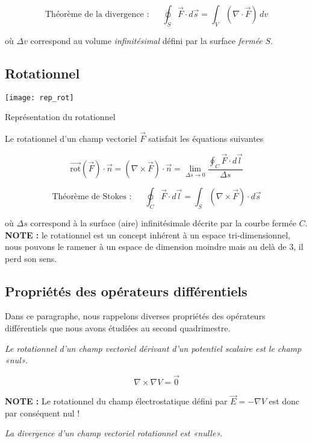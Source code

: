 \[\mbox{Théorème de la divergence : } \hspace{15pt} \oint_{S} \vec{F} \cdot d\vec{s} = \int_{V} (\nabla \cdot \vec{F}) \, dv\]

où $\Delta v$ correspond au volume \textit{infinitésimal} défini par la surface \textit{fermée} $S$.



\subsection{Rotationnel} 
\begin{marginfigure}
	\texttt{[image: rep\_rot]}
	\caption{Représentation du rotationnel}
\end{marginfigure}

Le rotationnel d'un champ vectoriel $\vec{F}$ satisfait les équations suivantes  

\[  \vec{\text{rot}}(\vec{F}) \cdot \vec{n}   = (\nabla \times \vec{F}) \cdot \vec{n} = \lim_{\Delta s \to 0} \frac{\oint_{C} \vec{F} \cdot d\vec{l} }{\Delta s}\]

\[\mbox{Théorème de Stokes : } \hspace{15pt} \oint_{C} \vec{F} \cdot d\vec{l} = \int_{S} (\nabla \times \vec{F}) \cdot d\vec{s}\]

où $\Delta s$ correspond à la surface (aire) infinitésimale décrite par la courbe fermée $C$. \\
\textbf{NOTE : } le rotationnel est un concept inhérent à un espace tri-dimensionnel, nous pouvons le ramener à un espace de dimension moindre 
mais au delà de 3, il perd son sens.

\subsection{Propriétés des opérateurs différentiels}

Dans ce paragraphe, nous rappelons diverses propriétés des opérateurs différentiels que nous avons étudiées au second quadrimestre. 

\textit{Le rotationnel d'un champ vectoriel dérivant d'un potentiel scalaire est le champ «nul».} 

\[\nabla \times \nabla V = \vec{0} \] 

\textbf{NOTE : } Le rotationnel du champ électrostatique défini par $\vec{E} = -\nabla V$ est donc par conséquent nul !

\textit{La divergence d'un champ vectoriel rotationnel est  «nulle».}  

